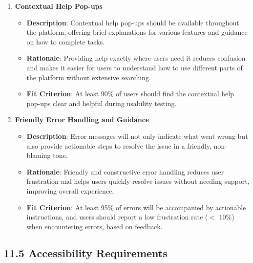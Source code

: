 \documentclass[12pt]{article}
\begin{document}
\begin{enumerate}
    \item \textbf{Contextual Help Pop-ups}  
        \begin{itemize} 
            \item \textbf{Description}: Contextual help pop-ups should be available throughout the platform, offering brief explanations for various features and guidance on how to complete tasks.  
            \item \textbf{Rationale}: Providing help exactly where users need it reduces confusion and makes it easier for users to understand how to use different parts of the platform without extensive searching.  
            \item \textbf{Fit Criterion}: At least 90\% of users should find the contextual help pop-ups clear and helpful during usability testing.
        \end{itemize}
    \item \textbf{Friendly Error Handling and Guidance}  
        \begin{itemize} 
            \item \textbf{Description}: Error messages will not only indicate what went wrong but also provide actionable steps to resolve the issue in a friendly, non-blaming tone.  
            \item \textbf{Rationale}: Friendly and constructive error handling reduces user frustration and helps users quickly resolve issues without needing support, improving overall experience.  
            \item \textbf{Fit Criterion}: At least 95\% of errors will be accompanied by actionable instructions, and users should report a low frustration rate ($<$ 10\%) when encountering errors, based on feedback.
        \end{itemize}
\end{enumerate}

\subsection*{11.5 Accessibility Requirements}
\end{document}
